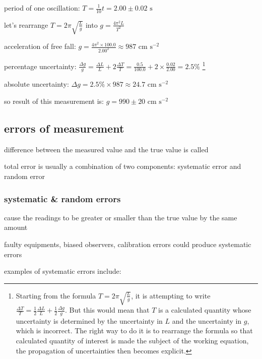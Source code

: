 \sol period of one oscillation: $T = \frac{1}{10}t = 2.00 \pm 0.02 \text{ s}$

let's rearrange $T=2\pi\sqrt{\frac{L}{g}}$ into $g = \frac{4\pi^2L}{T^2}$

acceleration of free fall: $g = \frac{4\pi^2 \times 100.0}{2.00^2} \approx 987 \text{ cm s}^{-2}$

\eqyskip percentage uncertainty: $\frac{\Delta g}{g} = \frac{\Delta L}{L} + 2\frac{\Delta T}{T} = \frac{0.5}{100.0} + 2\times\frac{0.02}{2.00} = 2.5\%$ \footnote{Starting from the formula $T=2\pi\sqrt{\frac{L}{g}}$, it is attempting to write $\frac{\Delta T}{T} = \frac{1}{2}\frac{\Delta L}{L} + \frac{1}{2}\frac{\Delta g}{g}$. But this would mean that $T$ is a calculated quantity whose uncertainty is determined by the uncertainty in $L$ and the uncertainty in $g$, which is incorrect. The right way to do it is to rearrange the formula so that calculated quantity of interest is made the subject of the working equation, the propagation of uncertainties then becomes explicit.}

absolute uncertainty: $\Delta g = 2.5\% \times 987 \approx 24.7 \text{ cm s}^{-2}$

so result of this measurement is: $ g = 990 \pm 20 \text{ cm s}^{-2}$ \eoe




\subsection{errors of measurement}

difference between the measured value and the true value is called 

total error is usually a combination of two components: systematic error and random error

\subsubsection{systematic \& random errors}

\begin{ilight}
	 cause the readings to be greater or smaller than the true value by the same amount
\end{ilight}

\cmt faulty equipments, biased observers, calibration errors could produce systematic errors

examples of systematic errors include:

